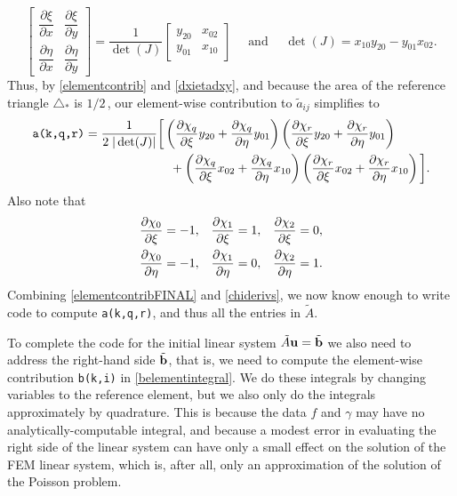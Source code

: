 \begin{equation}
\begin{bmatrix}
    \dfrac{\partial \xi}{\partial x} & \dfrac{\partial \xi}{\partial y} \\[1.0em]
    \dfrac{\partial \eta}{\partial x} & \dfrac{\partial \eta}{\partial y}
\end{bmatrix}
= \frac{1}{\det(J)}
\begin{bmatrix}
    y_{20} & x_{02} \\
    y_{01} & x_{10}
\end{bmatrix}
\quad \text{ and } \quad
\det(J) = x_{10} y_{20} - y_{01} x_{02}. \label{dxietadxy}
\end{equation}
Thus, by \eqref{elementcontrib} and \eqref{dxietadxy}, and because the area of the reference triangle $\triangle_\ast$ is $1/2$\,, our element-wise contribution to $\tilde a_{ij}$ simplifies to
\begin{align}
\text{\texttt{a(k,q,r)}} = \frac{1}{2\; |\det(J)|} &\bigg[\left(\frac{\partial \chi_q}{\partial \xi} y_{20} + \frac{\partial \chi_q}{\partial \eta} y_{01}\right) \left(\frac{\partial \chi_r}{\partial \xi} y_{20} + \frac{\partial \chi_r}{\partial \eta} y_{01}\right) \label{elementcontribFINAL} \\
&\quad + \left(\frac{\partial \chi_q}{\partial \xi} x_{02} + \frac{\partial \chi_q}{\partial \eta} x_{10}\right) \left(\frac{\partial \chi_r}{\partial \xi} x_{02} + \frac{\partial \chi_r}{\partial \eta} x_{10}\right)\bigg]. \notag
\end{align}
Also note that
\begin{align}
\frac{\partial \chi_0}{\partial \xi} &= -1, & \frac{\partial \chi_1}{\partial \xi} &= 1, & \frac{\partial \chi_2}{\partial \xi} &= 0, \label{chiderivs} \\
\frac{\partial \chi_0}{\partial \eta} &= -1, & \frac{\partial \chi_1}{\partial \eta} &= 0, & \frac{\partial \chi_2}{\partial \eta} &= 1. \notag
\end{align}
Combining \eqref{elementcontribFINAL} and \eqref{chiderivs}, we now know enough to write code to compute \texttt{a(k,q,r)}, and thus all the entries in $\tilde A$.

To complete the code for the initial linear system $\tilde A \mathbf{u} = \tilde{\mathbf{b}}$ we also need to address the right-hand side $\tilde{\mathbf{b}}$, that is, we need to compute the element-wise contribution \texttt{b(k,i)} in \eqref{belementintegral}.  We do these integrals by changing variables to the reference element, but we also only do the integrals approximately by quadrature.  This is because the data $f$ and $\gamma$ may have no analytically-computable integral, and because a modest error in evaluating the right side of the linear system can have only a small effect on the solution of the FEM linear system, which is, after all, only an approximation of the solution of the Poisson problem.

